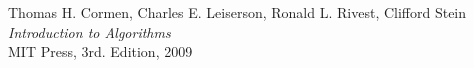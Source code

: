
\newpage


\begin{thebibliography}{9}
\label{bibliography}

  Thomas H. Cormen, Charles E. Leiserson, Ronald L. Rivest, Clifford Stein\\
  \textit{Introduction to Algorithms}\\
  MIT Press, 3rd. Edition, 2009\\

\end{thebibliography}

